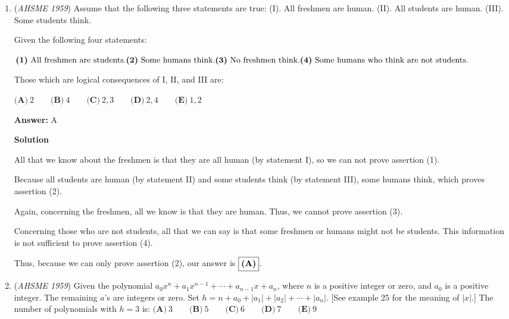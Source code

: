 \begin{enumerate}
 \textbf{Answer: }B



\textbf{Solution}

From the given information, we know that there were $7+5+6=18$ halves of the day (either afternoons or mornings), so there were $\frac{18}{2}=9$ days in total, which is answer choice $\boxed{\textbf{(B)}}$.

 


	\item (\textit{AHSME 1959}) Assume that the following three statements are true:
(I). All freshmen are human. (II). All students are human. (III). Some students think.


 Given the following four statements:


 $\textbf{(1)}\ \text{All freshmen are students.}\qquad \\ \textbf{(2)}\ \text{Some humans think.}\qquad \\ \textbf{(3)}\ \text{No freshmen think.}\qquad \\ \textbf{(4)}\ \text{Some humans who think are not students.}$


 Those which are logical consequences of I, II, and III are:


 $\textbf{(A)}\ 2\qquad\textbf{(B)}\ 4\qquad\textbf{(C)}\ 2,3\qquad\textbf{(D)}\ 2,4\qquad\textbf{(E)}\ 1,2$

 \textbf{Answer: }A



\textbf{Solution}

All that we know about the freshmen is that they are all human (by statement I), so we can not prove assertion (1).

 Because all students are human (by statement II) and some students think (by statement III), some humans think, which proves assertion (2).

 Again, concerning the freshmen, all we know is that they are human. Thus, we cannot prove assertion (3). 

 Concerning those who are not students, all that we can say is that some freshmen or humans might not be students. This information is not sufficient to prove assertion (4).

 Thus, because we can only prove assertion (2), our answer is $\fbox{\textbf{(A)}}$.

 


	\item (\textit{AHSME 1959}) Given the polynomial $a_0x^n+a_1x^{n-1}+\cdots+a_{n-1}x+a_n$, where $n$ is a positive integer or zero, and $a_0$ is a positive integer. 
The remaining $a$'s are integers or zero. Set $h=n+a_0+|a_1|+|a_2|+\cdots+|a_n|$. [See example 25 for the meaning of $|x|$.] 
The number of polynomials with $h=3$ is:
$\textbf{(A)}\ 3\qquad\textbf{(B)}\ 5\qquad\textbf{(C)}\ 6\qquad\textbf{(D)}\ 7\qquad\textbf{(E)}\ 9$


\end{enumerate}
